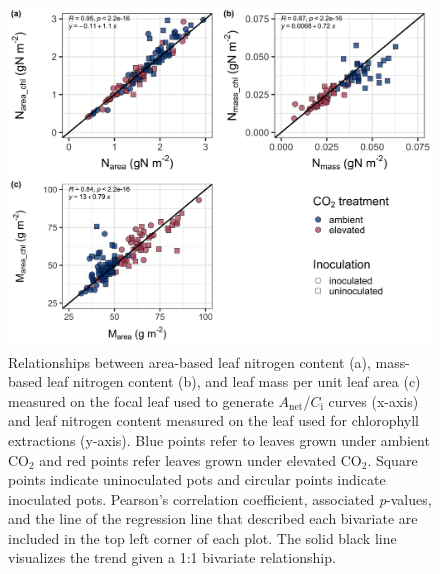 \newpage
\begin{figure}
    \centering
    \includegraphics[scale = 0.0625]{ch5_NxCO2xI/figs/NxCO2xI_figS1_leafN_chl_.png}
    \caption[Relationships between area-based leaf nitrogen content, mass-based leaf nitrogen content, and leaf mass per unit leaf area measured on the focal leaf used to generate $A_\mathrm{net}$/$C_\mathrm{i}$ curves and leaf nitrogen content measured on the leaf used for chlorophyll extractions]{Relationships between area-based leaf nitrogen content (a), mass-based leaf nitrogen content (b), and leaf mass per unit leaf area (c) measured on the focal leaf used to generate $A_\mathrm{net}$/$C_\mathrm{i}$ curves (x-axis) and leaf nitrogen content measured on the leaf used for chlorophyll extractions (y-axis). Blue points refer to leaves grown under ambient CO$_2$ and red points refer leaves grown under elevated CO$_2$. Square points indicate uninoculated pots and circular points indicate inoculated pots. Pearson's correlation coefficient, associated \textit{p}-values, and the line of the regression line that described each bivariate are included in the top left corner of each plot. The solid black line visualizes the trend given a 1:1 bivariate relationship.}
    \label{fig:figure.d1}
\end{figure}
\clearpage



